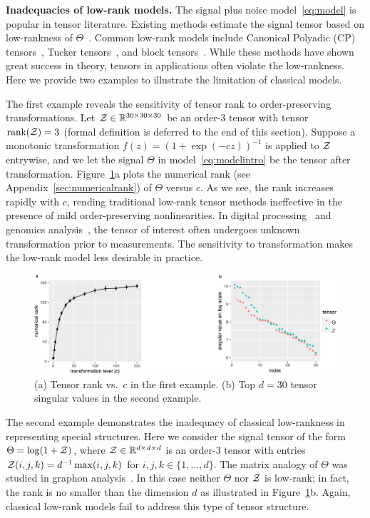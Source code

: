 \documentclass{article}
\theoremstyle{plain}
\theoremstyle{definition}
\begin{document}
{\bf Inadequacies of  low-rank models.} The signal plus noise model~\eqref{eq:model} is popular in tensor literature. Existing methods estimate the signal tensor based on low-rankness of $\Theta$~\citep{jain2014provable,montanari2018spectral}. Common low-rank models include Canonical Polyadic (CP) tensors~\citep{hitchcock1927expression}, Tucker tensors~\citep{de2000multilinear}, and block tensors~\citep{wang2019multiway}. While these methods have shown great success in theory, tensors in applications often violate the low-rankness. Here we provide two examples to illustrate the limitation of classical models.


The first example reveals the sensitivity of tensor rank to order-preserving transformations. Let $\mathcal{Z} \in \mathbb{R}^{30\times 30\times 30}$ be an order-3 tensor with tensor $\text{rank}(\mathcal{Z})=3$ (formal definition is deferred to the end of this section). Suppose a monotonic transformation $f(z)=(1+\exp(-cz))^{-1}$ is applied to $\mathcal{Z}$ entrywise, and we let the signal $\Theta$ in model~\eqref{eq:modelintro} be the tensor after transformation. Figure~\ref{fig:example}a plots the numerical rank (see Appendix~\ref{sec:numericalrank}) of $\Theta$ versus $c$. As we see, the rank increases rapidly with $c$, rending traditional low-rank tensor methods ineffective in the presence of mild order-preserving nonlinearities. In  digital processing~\citep{ghadermarzy2018learning} and genomics analysis~\citep{hore2016tensor}, the tensor of interest often undergoes unknown transformation prior to measurements. The sensitivity to transformation makes the low-rank model less desirable in practice. 

\begin{figure}[h]
\captionsetup{font=footnotesize}
\centering
\vspace{-.15cm}
\includegraphics[width=.65\textwidth]{figure/example_comb2.pdf}
\vspace{-.05cm}
\caption{(a) Tensor rank vs.\ $c$ in the first example. (b) Top $d=30$ tensor singular values in the second example. }
\vspace{-.2cm}
\label{fig:example}
\end{figure}

The second example demonstrates the inadequacy of classical low-rankness in representing special structures. Here we consider the signal tensor of the form $\Theta=\log(1+\mathcal{Z})$, where $\mathcal{Z}\in\mathbb{R}^{d\times d\times d}$ is an order-3 tensor with entries $\mathcal{Z}(i,j,k)=d^{-1}\max(i,j,k)$ for $i,j,k\in\{1,\ldots,d\}$. The matrix analogy of $\Theta$ was studied in graphon analysis~\cite{chan2014consistent}. In this case neither $\Theta$ nor $\mathcal{Z}$ is low-rank; in fact, the rank is no smaller than the dimension $d$ as illustrated in Figure~\ref{fig:example}b. Again, classical low-rank models fail to address this type of tensor structure. 
\end{document}
